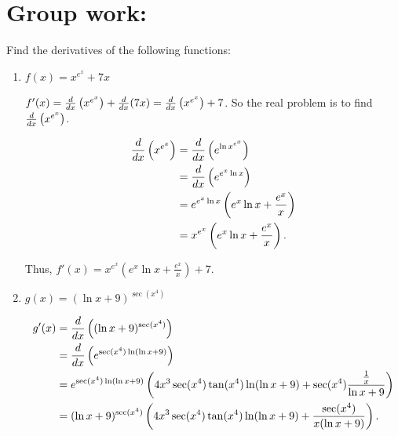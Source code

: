 \documentclass[handout,nooutcomes]{ximera}
\begin{document}
		
		

	
	
	
	
	

\section*{Group work:}



\begin{problem}
Find the derivatives of the following functions:
	\begin{enumerate}
	
	\item  $f(x) = x^{e^x} + 7x$
		\begin{freeResponse}
		$f'(x) = \frac{d}{dx} \left(x^{e^x} \right) + \frac{d}{dx}(7x) = \frac{d}{dx} \left(x^{e^x} \right) + 7$.  So the real problem is to find $\frac{d}{dx} \left(x^{e^x} \right)$.  
		
		\begin{align*}
		\frac{d}{dx} \left( x^{e^x} \right) &= \frac{d}{dx} \left( e^{\ln x^{e^x}} \right) \\
		&= \frac{d}{dx} \left( e^{e^x \ln x} \right) \\
		&= e^{e^x \ln x} \left( e^x \ln x + \frac{e^x}{x} \right) \\
		&= x^{e^x} \left( e^x \ln x + \frac{e^x}{x} \right).
		\end{align*}
		
		Thus, $f'(x) = x^{e^x} \left( e^x \ln x + \frac{e^x}{x} \right) + 7$.  
		
		\end{freeResponse}
		
		
		
	\item  $g(x) = (\ln x + 9)^{\sec(x^4)}$
		\begin{freeResponse}
			\begin{align*}
			g'(x) &= \frac{d}{dx} \left( (\ln x + 9)^{\sec(x^4)} \right) \\
			&= \frac{d}{dx} \left( e^{\sec(x^4) \ln ( \ln x + 9) } \right) \\
			&= e^{\sec(x^4) \ln ( \ln x + 9)} \left( 4x^3 \sec(x^4) \tan(x^4) \ln(\ln x + 9) + \sec(x^4) \frac{\frac{1}{x}}{\ln x + 9} \right) \\
			&= (\ln x + 9)^{\sec(x^4)} \left( 4x^3 \sec(x^4) \tan(x^4) \ln(\ln x + 9) + \frac{\sec(x^4)}{x(\ln x + 9)} \right) .
			\end{align*}
		\end{freeResponse}
		

\end{enumerate}
\end{problem}
\end{document}
